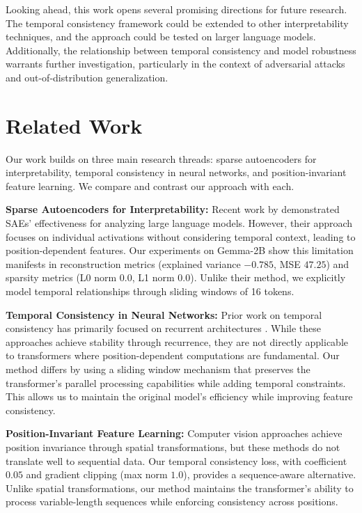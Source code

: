 \documentclass{article} %
\begin{document}
Looking ahead, this work opens several promising directions for future research. The temporal consistency framework could be extended to other interpretability techniques, and the approach could be tested on larger language models. Additionally, the relationship between temporal consistency and model robustness warrants further investigation, particularly in the context of adversarial attacks and out-of-distribution generalization.

\section{Related Work}
\label{sec:related}

Our work builds on three main research threads: sparse autoencoders for interpretability, temporal consistency in neural networks, and position-invariant feature learning. We compare and contrast our approach with each.

\textbf{Sparse Autoencoders for Interpretability:} Recent work by \cite{Bricken2023EmergenceOS} demonstrated SAEs' effectiveness for analyzing large language models. However, their approach focuses on individual activations without considering temporal context, leading to position-dependent features. Our experiments on Gemma-2B show this limitation manifests in reconstruction metrics (explained variance $-0.785$, MSE $47.25$) and sparsity metrics (L0 norm $0.0$, L1 norm $0.0$). Unlike their method, we explicitly model temporal relationships through sliding windows of 16 tokens.

\textbf{Temporal Consistency in Neural Networks:} Prior work on temporal consistency has primarily focused on recurrent architectures \cite{vaswani2017attention}. While these approaches achieve stability through recurrence, they are not directly applicable to transformers where position-dependent computations are fundamental. Our method differs by using a sliding window mechanism that preserves the transformer's parallel processing capabilities while adding temporal constraints. This allows us to maintain the original model's efficiency while improving feature consistency.

\textbf{Position-Invariant Feature Learning:} Computer vision approaches \cite{goodfellow2016deep} achieve position invariance through spatial transformations, but these methods do not translate well to sequential data. Our temporal consistency loss, with coefficient $0.05$ and gradient clipping (max norm $1.0$), provides a sequence-aware alternative. Unlike spatial transformations, our method maintains the transformer's ability to process variable-length sequences while enforcing consistency across positions.
\end{document}
